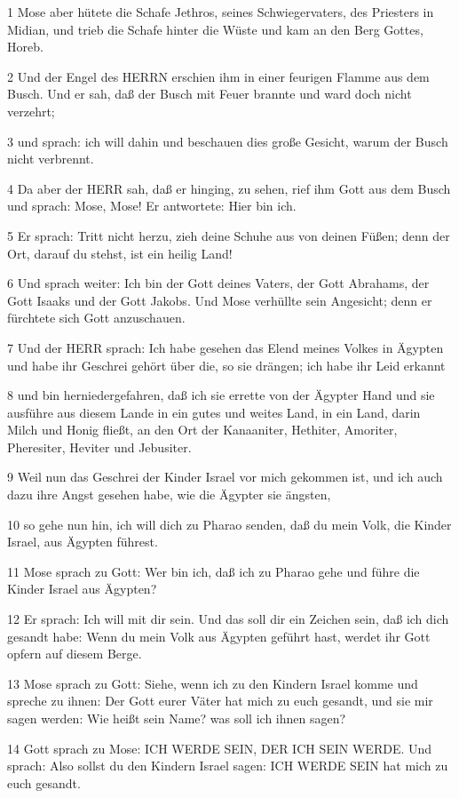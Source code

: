 \par 1 Mose aber hütete die Schafe Jethros, seines Schwiegervaters, des Priesters in Midian, und trieb die Schafe hinter die Wüste und kam an den Berg Gottes, Horeb.
\par 2 Und der Engel des HERRN erschien ihm in einer feurigen Flamme aus dem Busch. Und er sah, daß der Busch mit Feuer brannte und ward doch nicht verzehrt;
\par 3 und sprach: ich will dahin und beschauen dies große Gesicht, warum der Busch nicht verbrennt.
\par 4 Da aber der HERR sah, daß er hinging, zu sehen, rief ihm Gott aus dem Busch und sprach: Mose, Mose! Er antwortete: Hier bin ich.
\par 5 Er sprach: Tritt nicht herzu, zieh deine Schuhe aus von deinen Füßen; denn der Ort, darauf du stehst, ist ein heilig Land!
\par 6 Und sprach weiter: Ich bin der Gott deines Vaters, der Gott Abrahams, der Gott Isaaks und der Gott Jakobs. Und Mose verhüllte sein Angesicht; denn er fürchtete sich Gott anzuschauen.
\par 7 Und der HERR sprach: Ich habe gesehen das Elend meines Volkes in Ägypten und habe ihr Geschrei gehört über die, so sie drängen; ich habe ihr Leid erkannt
\par 8 und bin herniedergefahren, daß ich sie errette von der Ägypter Hand und sie ausführe aus diesem Lande in ein gutes und weites Land, in ein Land, darin Milch und Honig fließt, an den Ort der Kanaaniter, Hethiter, Amoriter, Pheresiter, Heviter und Jebusiter.
\par 9 Weil nun das Geschrei der Kinder Israel vor mich gekommen ist, und ich auch dazu ihre Angst gesehen habe, wie die Ägypter sie ängsten,
\par 10 so gehe nun hin, ich will dich zu Pharao senden, daß du mein Volk, die Kinder Israel, aus Ägypten führest.
\par 11 Mose sprach zu Gott: Wer bin ich, daß ich zu Pharao gehe und führe die Kinder Israel aus Ägypten?
\par 12 Er sprach: Ich will mit dir sein. Und das soll dir ein Zeichen sein, daß ich dich gesandt habe: Wenn du mein Volk aus Ägypten geführt hast, werdet ihr Gott opfern auf diesem Berge.
\par 13 Mose sprach zu Gott: Siehe, wenn ich zu den Kindern Israel komme und spreche zu ihnen: Der Gott eurer Väter hat mich zu euch gesandt, und sie mir sagen werden: Wie heißt sein Name? was soll ich ihnen sagen?
\par 14 Gott sprach zu Mose: ICH WERDE SEIN, DER ICH SEIN WERDE. Und sprach: Also sollst du den Kindern Israel sagen: ICH WERDE SEIN hat mich zu euch gesandt.
